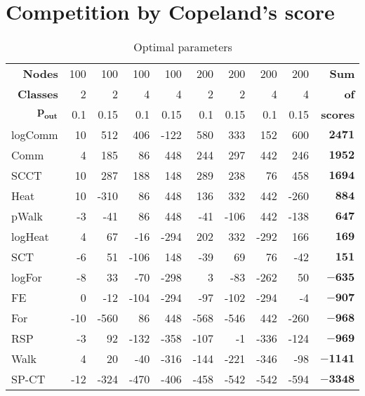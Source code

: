 \documentclass{article}
\begin{document}
\section{Competition by Copeland's score}
\begin{table}[H]{\small
	\centering
	\begin{tabular}{lrrrrrrrrr}
		\toprule
		\multicolumn{1}{r}{\textbf{Nodes}}         & 100&    100& 100&  100& 200&  200& 200&  200&{\textbf{Sum}} \\
		\multicolumn{1}{r}{\textbf{Classes}}	   &   2&      2&   4&    4&   2&    2&   4&    4&{\textbf{  of}} \\
		\multicolumn{1}{r}{$\bm{p_{\mathbf{out}}}$}& 0.1&	0.15& 0.1& 0.15& 0.1& 0.15& 0.1& 0.15&{\textbf{scores}} \\
		\midrule
logComm  & 10 & 512 & 406 & -122 & 580 & 333 & 152 & 600 & $\bm{2471}$\\
Comm & 4 & 185 & 86 & 448 & 244 & 297 & 442 & 246 & $\bm{1952}$\\
SCCT & 10 & 287 & 188 & 148 & 289 & 238 & 76 & 458 & $\bm{1694}$\\
Heat & 10 & -310 & 86 & 448 & 136 & 332 & 442 & -260 & $\bm{884}$\\
pWalk & -3 & -41 & 86 & 448 & -41 & -106 & 442 & -138 & $\bm{647}$\\
logHeat & 4 & 67 & -16 & -294 & 202 & 332 & -292 & 166 & $\bm{169}$\\
SCT & -6 & 51 & -106 & 148 & -39 & 69 & 76 & -42 & $\bm{151}$\\
logFor & -8 & 33 & -70 & -298 & 3 & -83 & -262 & 50 & $\bm{-635}$\\
FE & 0 & -12 & -104 & -294 & -97 & -102 & -294 & -4 & $\bm{-907}$\\
For & -10 & -560 & 86 & 448 & -568 & -546 & 442 & -260 & $\bm{-968}$\\
RSP & -3 & 92 & -132 & -358 & -107 & -1 & -336 & -124 & $\bm{-969}$\\
Walk & 4 & 20 & -40 & -316 & -144 & -221 & -346 & -98 & $\bm{-1141}$\\
SP-CT & -12 & -324 & -470 & -406 & -458 & -542 & -542 & -594 & $\bm{-3348}$\\
		\bottomrule
	\end{tabular}
	\caption{\label{t_CopComp} Optimal parameters}
}\end{table}
\end{document}
